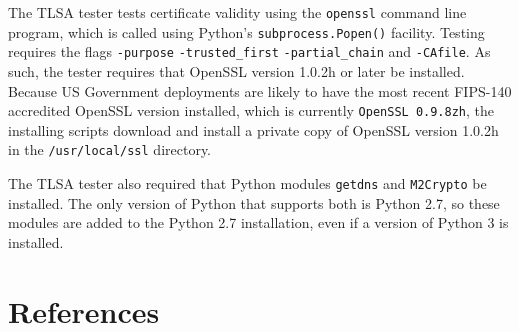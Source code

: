 \documentclass[preprint,5p]{elsarticle}
\begin{document}
The TLSA tester tests certificate validity using the \verb+openssl+
command line program, which is called using Python's \verb+subprocess.Popen()+
facility. Testing requires the flags \verb+-purpose+
\verb+-trusted_first+ \verb+-partial_chain+ and \verb+-CAfile+. As
such, the tester requires that OpenSSL version 1.0.2h or later be
installed.  Because US Government deployments are likely to have the
most recent FIPS-140 accredited OpenSSL version installed, which is
currently \verb+OpenSSL 0.9.8zh+, the installing scripts download and
install a private copy of OpenSSL version 1.0.2h in the
\verb+/usr/local/ssl+ directory.

The TLSA tester also required that Python modules \verb+getdns+ and \verb+M2Crypto+
be installed. The only version of Python that supports both is Python
2.7, so these modules are added to the Python 2.7 installation, even
if a version of Python 3 is installed.

\section*{References}


\end{document}
